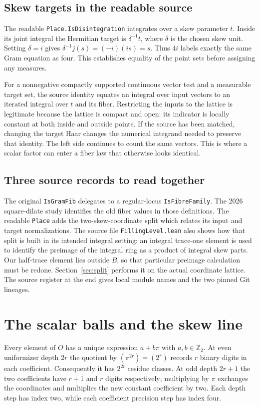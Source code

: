 \documentclass[12pt,letterpaper]{article}
\newcommand{\id}[1]{{\small\nolinkurl{#1}}}
\begin{document}
\subsection{Skew targets in the readable source}
The readable \id{Place.IsDisintegration} integrates over a skew parameter $t$. Inside its joint integral the Hermitian target is $\delta^{-1}t$, where $\delta$ is the chosen skew unit. Setting $\delta=i$ gives $\delta^{-1}j(s)=(-i)(is)=s$. Thus $4i$ labels exactly the same Gram equation as four. This establishes equality of the point sets before assigning any measures.

For a nonnegative compactly supported continuous vector test and a measurable target set, the source identity equates an integral over input vectors to an iterated integral over $t$ and its fiber. Restricting the inputs to the lattice is legitimate because the lattice is compact and open: its indicator is locally constant at both inside and outside points. If the source has been matched, changing the target Haar changes the numerical integrand needed to preserve that identity. The left side continues to count the same vectors. This is where a scalar factor can enter a fiber law that otherwise looks identical.

\subsection{Three source records to read together}
The original \id{IsGramFib} delegates to a regular-locus \id{IsFibreFamily}. The 2026 square-dilate study identifies the old fiber values in those definitions. The readable \id{Place} adds the two-skew-coordinate split which relates its input and target normalizations. The source file \id{FillingLevel.lean} also shows how that split is built in its intended integral setting: an integral trace-one element is used to identify the preimage of the integral ring as a product of integral skew parts. Our half-trace element lies outside $B$, so that particular preimage calculation must be redone. Section~\ref{sec:split} performs it on the actual coordinate lattice. The source register at the end gives local module names and the two pinned Git lineages.

\section{The scalar balls and the skew line}
Every element of $O$ has a unique expression $a+b\pi$ with $a,b\in\mathbb Z_2$. At even uniformizer depth $2r$ the quotient by $(\pi^{2r})=(2^r)$ records $r$ binary digits in each coefficient. Consequently it has $2^{2r}$ residue classes. At odd depth $2r+1$ the two coefficients have $r+1$ and $r$ digits respectively; multiplying by $\pi$ exchanges the coordinates and multiplies the new constant coefficient by two. Each depth step has index two, while each coefficient precision step has index four.
\end{document}
